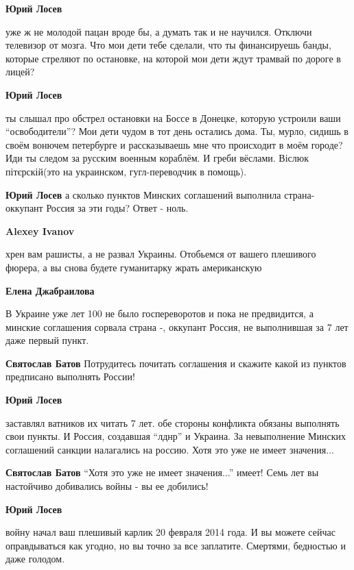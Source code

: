 \begin{itemize}
\begin{itemize}
\textbf{Юрий Лосев} 

уже ж не молодой пацан вроде бы, а думать так и не научился. Отключи телевизор
от мозга. Что мои дети тебе сделали, что ты финансируешь банды, которые
стреляют по остановке, на которой мои дети ждут трамвай по дороге в лицей?

\textbf{Юрий Лосев} 

ты слышал про обстрел остановки на Боссе в Донецке, которую устроили ваши
\enquote{освободители}? Мои дети чудом в тот день остались дома. Ты, мурло, сидишь в
своём вонючем петербурге и рассказываешь мне что происходит в моём городе? Иди
ты следом за русским военным кораблём. И греби вёслами. Віслюк пітєрскій(это на
украинском, гугл-переводчик в помощь).

\textbf{Юрий Лосев} а сколько пунктов Минских соглашений выполнила страна-оккупант Россия за эти годы? Ответ - ноль.

\textbf{Alexey Ivanov} 

хрен вам рашисты, а не развал Украины. Отобьемся от вашего плешивого фюрера, а
вы снова будете гуманитарку жрать американскую

\textbf{Елена Джабраилова} 

В Украине уже лет 100 не было госпереворотов и пока не предвидится, а минские
соглашения сорвала страна -, оккупант Россия, не выполнившая за 7 лет даже первый
пункт.

\textbf{Святослав Батов} Потрудитесь почитать соглашения и скажите какой из пунктов предписано выполнять России!

\textbf{Юрий Лосев} 

заставлял ватников их читать 7 лет. обе стороны конфликта обязаны выполнять
свои пункты. И Россия, создавшая \enquote{лднр} и Украина. За невыполнение Минских
соглашений санкции налагались на россию. Хотя это уже не имеет значения...

\textbf{Святослав Батов} \enquote{Хотя это уже не имеет значения...} имеет! Семь лет вы настойчиво добивались войны - вы ее добились!

\textbf{Юрий Лосев} 

войну начал ваш плешивый карлик 20 февраля 2014 года. И вы можете сейчас
оправдываться как угодно, но вы точно за все заплатите. Смертями, бедностью и
даже голодом.

\end{itemize} %


\end{itemize}
